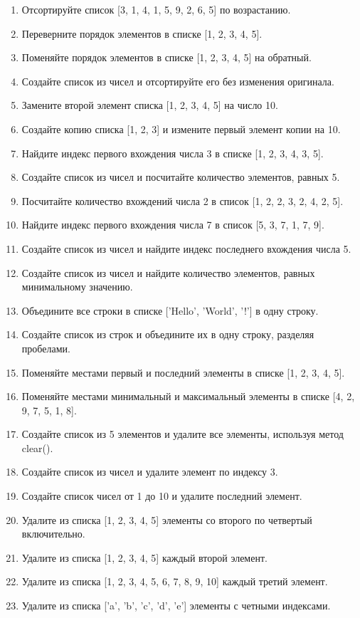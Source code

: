 \documentclass[a4,12pt]{article}
\theoremstyle{remark}
\begin{document}
\begin{enumerate}
    \item Отсортируйте список [3, 1, 4, 1, 5, 9, 2, 6, 5] по возрастанию.
    \item Переверните порядок элементов в списке [1, 2, 3, 4, 5].
    \item Поменяйте порядок элементов в списке [1, 2, 3, 4, 5] на обратный.
    \item Создайте список из чисел и отсортируйте его без изменения оригинала.
    \item Замените второй элемент списка [1, 2, 3, 4, 5] на число 10.
    \item Создайте копию списка [1, 2, 3] и измените первый элемент копии на 10.
    \item Найдите индекс первого вхождения числа 3 в списке [1, 2, 3, 4, 3, 5].
    \item Создайте список из чисел и посчитайте количество элементов, равных 5.
    \item Посчитайте количество вхождений числа 2 в список [1, 2, 2, 3, 2, 4, 2, 5].
    \item Найдите индекс первого вхождения числа 7 в список [5, 3, 7, 1, 7, 9].
    \item Создайте список из чисел и найдите индекс последнего вхождения числа 5.
    \item Создайте список из чисел и найдите количество элементов, равных минимальному значению.
    \item Объедините все строки в списке ['Hello', 'World', '!'] в одну строку.
    \item Создайте список из строк и объедините их в одну строку, разделяя пробелами.
    \item Поменяйте местами первый и последний элементы в списке [1, 2, 3, 4, 5].
    \item Поменяйте местами минимальный и максимальный элементы в списке [4, 2, 9, 7, 5, 1, 8].
    \item Создайте список из 5 элементов и удалите все элементы, используя метод clear().
    \item Создайте список из чисел и удалите элемент по индексу 3.
    \item Создайте список чисел от 1 до 10 и удалите последний элемент.
    \item Удалите из списка [1, 2, 3, 4, 5] элементы со второго по четвертый включительно.
    \item Удалите из списка [1, 2, 3, 4, 5] каждый второй элемент.
    \item Удалите из списка [1, 2, 3, 4, 5, 6, 7, 8, 9, 10] каждый третий элемент.
    \item Удалите из списка ['a', 'b', 'c', 'd', 'e'] элементы с четными индексами.

\end{enumerate}
\end{document}
